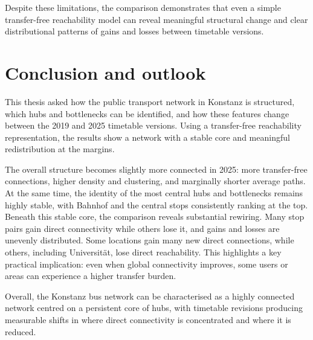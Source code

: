 \documentclass[12pt,a4paper,oneside]{report}
\begin{document}
Despite these limitations, the comparison demonstrates that even a simple transfer-free reachability model can reveal meaningful structural change and clear distributional patterns of gains and losses between timetable versions.

\chapter{Conclusion and outlook}\label{ch:conclusion}

This thesis asked how the public transport network in Konstanz is structured, which hubs and bottlenecks can be identified, and how these features change between the 2019 and 2025 timetable versions.
Using a transfer-free reachability representation, the results show a network with a stable core and meaningful redistribution at the margins.

The overall structure becomes slightly more connected in 2025: more transfer-free connections, higher density and clustering, and marginally shorter average paths.
At the same time, the identity of the most central hubs and bottlenecks remains highly stable, with Bahnhof and the central stops consistently ranking at the top.
Beneath this stable core, the comparison reveals substantial rewiring.
Many stop pairs gain direct connectivity while others lose it, and gains and losses are unevenly distributed.
Some locations gain many new direct connections, while others, including Universit\"{a}t, lose direct reachability.
This highlights a key practical implication: even when global connectivity improves, some users or areas can experience a higher transfer burden.

Overall, the Konstanz bus network can be characterised as a highly connected network centred on a persistent core of hubs, with timetable revisions producing measurable shifts in where direct connectivity is concentrated and where it is reduced.
\end{document}

